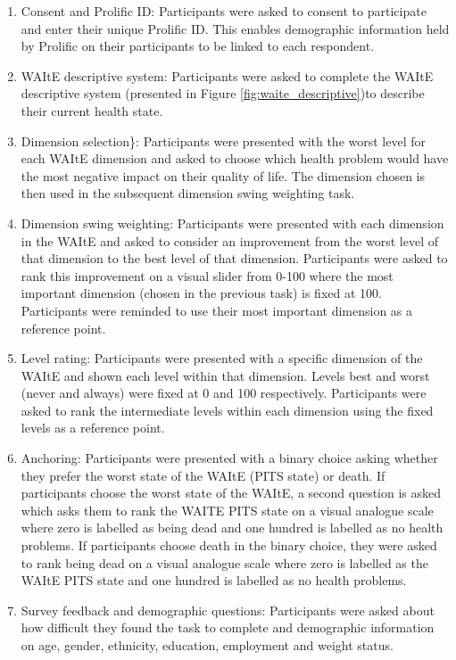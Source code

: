 \documentclass[
  number,
  preprint]{elsarticle}
\providecommand{\tightlist}{%
  \setlength{\itemsep}{0pt}\setlength{\parskip}{0pt}}\usepackage{longtable,booktabs,array}
\begin{document}
\begin{enumerate}
\def\labelenumi{\arabic{enumi}.}
\tightlist
\item
  Consent and Prolific ID: Participants were asked to consent to
  participate and enter their unique Prolific ID. This enables
  demographic information held by Prolific on their participants to be
  linked to each respondent.
\item
  WAItE descriptive system: Participants were asked to complete the
  WAItE descriptive system (presented in Figure
  \ref{fig:waite_descriptive})to describe their current health state.
\item
  Dimension selection\}: Participants were presented with the worst
  level for each WAItE dimension and asked to choose which health
  problem would have the most negative impact on their quality of life.
  The dimension chosen is then used in the subsequent dimension swing
  weighting task.\\
\item
  Dimension swing weighting: Participants were presented with each
  dimension in the WAItE and asked to consider an improvement from the
  worst level of that dimension to the best level of that dimension.
  Participants were asked to rank this improvement on a visual slider
  from 0-100 where the most important dimension (chosen in the previous
  task) is fixed at 100. Participants were reminded to use their most
  important dimension as a reference point.\\
\item
  Level rating: Participants were presented with a specific dimension of
  the WAItE and shown each level within that dimension. Levels best and
  worst (never and always) were fixed at 0 and 100 respectively.
  Participants were asked to rank the intermediate levels within each
  dimension using the fixed levels as a reference point.
\item
  Anchoring: Participants were presented with a binary choice asking
  whether they prefer the worst state of the WAItE (PITS state) or
  death. If participants choose the worst state of the WAItE, a second
  question is asked which asks them to rank the WAITE PITS state on a
  visual analogue scale where zero is labelled as being dead and one
  hundred is labelled as no health problems. If participants choose
  death in the binary choice, they were asked to rank being dead on a
  visual analogue scale where zero is labelled as the WAItE PITS state
  and one hundred is labelled as no health problems.
\item
  Survey feedback and demographic questions: Participants were asked
  about how difficult they found the task to complete and demographic
  information on age, gender, ethnicity, education, employment and
  weight status.
\end{enumerate}
\end{document}
